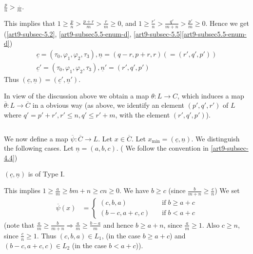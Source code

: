 \begin{case}\label{art9-5.7-case-2}
$\frac{p}{n} > \frac{.}{m}$.

This implies that $1 \geq \frac{p}{n} > \frac{p+r}{m} > \frac{r}{m} \geq 0$, and $1 \geq \frac{r'}{n} > \frac{q'}{m+n} > \frac{p'}{m} \geq 0$. Hence we get (\ref{art9-subsec-5.2}, \eqref{art9-subsec5.5-enum-d}, \ref{art9-subsec-5.5}\eqref{art9-subsec5.5-enum-d})
\begin{gather*}
\underline{c} = (\tau_{0}, \varphi_{1}, \varphi_{2}, \tau_{3}), \underline{n} = (q-r, p+r,r)(=(r',q',p'))\\
\underline{c}' = (\tau_{0}, \varphi_{1}, \varphi_{2}, \tau_{3}), \underline{n}'= (r', q',p')
\end{gather*}
Thus $(\underline{c}, \underline{n}) = (\underline{c}', \underline{n}')$.
\end{case}

In view of the discussion above we obtain a map $\theta: L \longrightarrow C$, which induces a map $\overline{\theta} : L \longrightarrow \overline{C}$ in a obvious way (as above, we identify an element $(p',q',r')$ of $L$ where $q'=p'+r', r'\leq n, q'\leq r'+m$, with the element $(r', q', p')$).


\setcounter{subsection}{7}
\subsection{}\label{art9-subsec-5.8}
We  now define a map $\overline{\psi} : \overline{C} \longrightarrow L$. Let $x \in \overline{C}$. Let $x_{\min} = (\underline{c}, \underline{n})$. We distinguish the following cases. Let $\underline{n}= (a, b, c)$. ( We follow the convention
in \ref{art9-subsec-4.4})

\setcounter{case}{0}
\begin{case}\label{art9-subsec5.8-case-1}
$(\underline{c}, \underline{n})$ is of Type I.

This implies $ 1 \geq \frac{a}{m} \geq {b}{m+n} \geq{c}{n} \geq 0$. We have $b \geq c$ (since $\frac{b}{m+n} \geq \frac{c}{n}$) We set
\begin{align*}
\overline{\psi}(x) &=
\begin{cases}
(c,b,a)  \quad & \text{if} \; b \geq a + c\\
(b-c,a+c, c) \quad & \text{if} \; b < a + c
\end{cases} 
\end{align*}
(note that $\frac{a}{m} \geq \frac{b}{m+n} \Rightarrow \frac{a}{m} \geq \frac{b-a}{m}$ and hence $b \geq a + n$, since $\frac{a}{m} \geq 1$. Also $c \geq n$, since $\frac{c}{n} \geq 1$. Thus $(c, b, a)  \in L_{1}$, (in the case $b \geq a+ c$) and $(b-c, a+c, c) \in L_{2}$ (in the case $b < a+ c$)).
\end{case}


